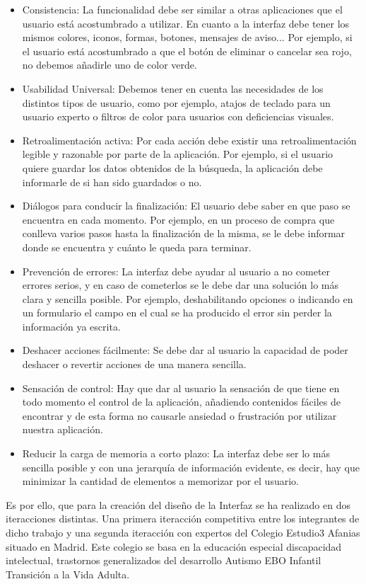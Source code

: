 \begin{itemize} 
	\item Consistencia: La funcionalidad debe ser similar a otras aplicaciones que el usuario está acostumbrado a utilizar. En cuanto a la interfaz debe tener los mismos colores, iconos, formas, botones, mensajes de aviso... Por ejemplo, si el usuario está acostumbrado a que el botón de eliminar o cancelar sea rojo, no debemos añadirle uno de color verde.
	\item Usabilidad Universal: Debemos tener en cuenta las necesidades de los distintos tipos de usuario, como por ejemplo, atajos de teclado para un usuario experto o filtros de color para usuarios con deficiencias visuales.
	\item Retroalimentación activa: Por cada acción debe existir una retroalimentación legible y razonable por parte de la aplicación. Por ejemplo, si el usuario quiere guardar los datos obtenidos de la búsqueda, la aplicación debe informarle de si han sido guardados o no.
	\item Diálogos para conducir la finalización: El usuario debe saber en que paso se encuentra en cada momento. Por ejemplo, en un proceso de compra que conlleva varios pasos hasta la finalización de la misma, se le debe informar donde se encuentra y cuánto le queda para terminar.
	\item Prevención de errores: La interfaz debe ayudar al usuario a no cometer errores serios, y en caso de cometerlos se le debe dar una solución lo más clara y sencilla posible. Por ejemplo, deshabilitando opciones o indicando en un formulario el campo en el cual se ha producido el error sin perder la información ya escrita.
	\item Deshacer acciones fácilmente: Se debe dar al usuario la capacidad de poder deshacer o revertir acciones de una manera sencilla. 
	\item Sensación de control: Hay que dar al usuario la sensación de que tiene en todo momento el control de la aplicación, añadiendo contenidos fáciles de encontrar y de esta forma no causarle ansiedad o frustración por utilizar nuestra aplicación.
	\item Reducir la carga de memoria a corto plazo: La interfaz debe ser lo más sencilla posible y con una jerarquía de información evidente, es decir, hay que minimizar la cantidad de elementos a memorizar por el usuario.
\end{itemize}
Es por ello, que para la creación del diseño de la Interfaz se ha realizado en dos iteracciones distintas. Una primera iteracción competitiva entre los integrantes de dicho trabajo y una segunda iteracción con expertos del Colegio Estudio3 Afanias situado en Madrid. Este colegio se basa en la educación especial discapacidad intelectual, trastornos generalizados del desarrollo Autismo EBO Infantil Transición a la Vida Adulta.

